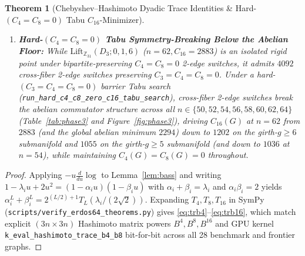 \documentclass[10pt,a4paper]{article}
\newtheorem{theorem}{Theorem}[section]
\theoremstyle{definition}
\theoremstyle{remark}
\begin{document}
\begin{theorem}[Chebyshev--Hashimoto Dyadic Trace Identities \& Hard-$(C_4=C_8=0)$ Tabu $C_{16}$-Minimizer]
\begin{enumerate}[label=(\alph*),nosep]
\begin{enumerate}[label=(\roman*),nosep]
  \end{enumerate}
  \item \textbf{Hard-$(C_4=C_8=0)$ Tabu Symmetry-Breaking Below the Abelian Floor:} While $\mathrm{Lift}_{\mathbb{Z}_{31}}(D_3; 0, 1, 6)$ ($n = 62, C_{16} = 2883$) is an isolated rigid point under bipartite-preserving $C_4=C_8=0$ 2-edge switches, it admits $4092$ cross-fiber 2-edge switches preserving $C_3 = C_4 = C_8 = 0$. Under a hard-$(C_3=C_4=C_8=0)$ barrier Tabu search (\texttt{run\_hard\_c4\_c8\_zero\_c16\_tabu\_search}), cross-fiber 2-edge switches break the abelian commutator structure across all $n \in \{50, 52, 54, 56, 58, 60, 62, 64\}$ (Table~\ref{tab:phase3} and Figure~\ref{fig:phase3}), driving $C_{16}(G)$ at $n = 62$ from $2883$ (and the global abelian minimum $2294$) down to \textbf{$1202$} on the girth-$g \ge 6$ submanifold and \textbf{$1055$} on the girth-$g \ge 5$ submanifold (and down to \textbf{$1036$} at $n = 54$), while maintaining $C_4(G) = C_8(G) = 0$ throughout.
\end{enumerate}
\end{theorem}

\begin{proof}
Applying $-u \frac{d}{du} \log$ to Lemma~\ref{lem:bass} and writing $1 - \lambda_i u + 2 u^2 = (1 - \alpha_i u)(1 - \beta_i u)$ with $\alpha_i + \beta_i = \lambda_i$ and $\alpha_i \beta_i = 2$ yields $\alpha_i^L + \beta_i^L = 2^{(L/2)+1} T_L(\lambda_i / (2\sqrt{2}))$. Expanding $T_4, T_8, T_{16}$ in SymPy (\texttt{scripts/verify\_erdos64\_theorems.py}) gives \eqref{eq:trb4}--\eqref{eq:trb16}, which match explicit $(3n \times 3n)$ Hashimoto matrix powers $B^4, B^8, B^{16}$ and GPU kernel \texttt{k\_eval\_hashimoto\_trace\_b4\_b8} bit-for-bit across all 28 benchmark and frontier graphs.
\end{proof}
\end{document}
